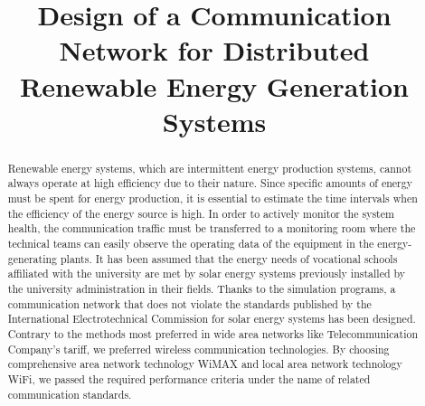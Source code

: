 \documentclass[conference, letterpaper]{IEEEtran}
\begin{document}
\title{Design of a Communication Network for Distributed Renewable Energy Generation Systems\\

}

\author{
\and
{}

}

\maketitle

\begin{abstract}
Renewable energy systems, which are intermittent energy production systems, cannot always operate at high efficiency due to their nature. Since specific amounts of energy must be spent for energy production, it is essential to estimate the time intervals when the efficiency of the energy source is high. In order to actively monitor the system health, the communication traffic must be transferred to a monitoring room where the technical teams can easily observe the operating data of the equipment in the energy-generating plants. It has been assumed that the energy needs of vocational schools affiliated with the university are met by solar energy systems previously installed by the university administration in their fields. Thanks to the simulation programs, a communication network that does not violate the standards published by the International Electrotechnical Commission for solar energy systems has been designed. Contrary to the methods most preferred in wide area networks like Telecommunication Company's tariff, we preferred wireless communication technologies. By choosing comprehensive area network technology WiMAX and local area network technology WiFi, we passed the required performance criteria under the name of related communication standards.
\end{abstract}
\end{document}
